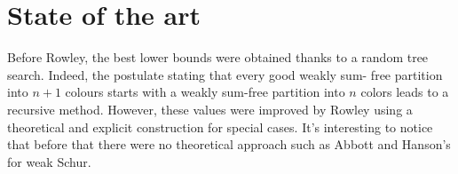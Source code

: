 \section{State of the art}

Before Rowley, the best lower bounds were obtained thanks to a random
tree search. Indeed, the postulate stating that every good weakly sum-
free partition into \(n+1\) colours starts with a weakly sum-free
partition into \(n\) colors leads to a recursive method. However,
these values were improved by Rowley using a theoretical and explicit
construction for special cases. It's interesting to notice that before
that there were no theoretical approach such as Abbott and Hanson's
\cite{AbbottHanson} for weak Schur.